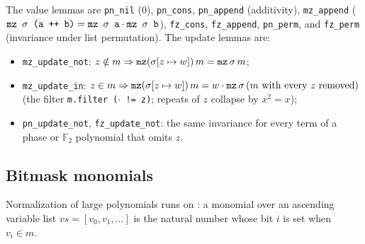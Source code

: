 \noindent The value lemmas are \textnormal{\texttt{pn\_\allowbreak{}nil}} ($0$), \textnormal{\texttt{pn\_\allowbreak{}cons}}, \textnormal{\texttt{pn\_\allowbreak{}append}}
(additivity), \textnormal{\texttt{mz\_\allowbreak{}append}} ($\textnormal{\texttt{mz \ensuremath{\sigma} (\allowbreak{}a ++ b)}} = \textnormal{\texttt{mz \ensuremath{\sigma} a}}\cdot\textnormal{\texttt{mz \ensuremath{\sigma} b}}$),
\textnormal{\texttt{fz\_\allowbreak{}cons}}, \textnormal{\texttt{fz\_\allowbreak{}append}}, \textnormal{\texttt{pn\_\allowbreak{}perm}}, and \textnormal{\texttt{fz\_\allowbreak{}perm}} (invariance under list
permutation). The update lemmas are:
\begin{itemize}
\item \textnormal{\texttt{mz\_\allowbreak{}update\_\allowbreak{}not}}: $z\notin m\Rightarrow \textnormal{\texttt{mz}} (\sigma[z\mapsto w])\,m = \textnormal{\texttt{mz}}\,\sigma\,m$;
\item \textnormal{\texttt{mz\_\allowbreak{}update\_\allowbreak{}in}}: $z\in m\Rightarrow \textnormal{\texttt{mz}}(\sigma[z\mapsto w])\,m = w\cdot\textnormal{\texttt{mz}}\,\sigma\,(m \text{ with every } z \text{ removed})$
  (the filter \textnormal{\texttt{m.\allowbreak{}filter (\allowbreak{}\ensuremath{\cdot} != z)}}; repeats of $z$ collapse by $x^2=x$);
\item \textnormal{\texttt{pn\_\allowbreak{}update\_\allowbreak{}not}}, \textnormal{\texttt{fz\_\allowbreak{}update\_\allowbreak{}not}}: the same invariance for every term of a phase or
  $\mathbb F_2$ polynomial that omits $z$.
\end{itemize}

\subsection{Bitmask monomials}

Normalization of large polynomials runs on : a monomial over an ascending variable list
$vs = [v_0,v_1,\dots]$ is the natural number whose bit $i$ is set when $v_i\in m$.

